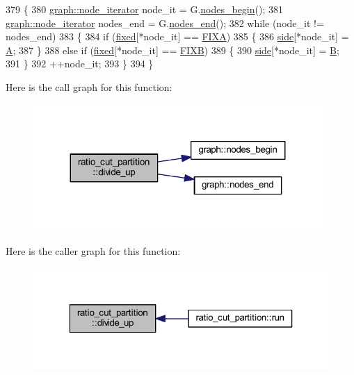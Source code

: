 \begin{DoxyCode}
379 \{
380     \mbox{\hyperlink{classgraph_a2cb374b84c133ce13f94e73c3e5da7fa}{graph::node\_iterator}} node\_it = G.\mbox{\hyperlink{classgraph_aec053a4b509d1be804237a80044c54c0}{nodes\_begin}}();
381     \mbox{\hyperlink{classgraph_a2cb374b84c133ce13f94e73c3e5da7fa}{graph::node\_iterator}} nodes\_end = G.\mbox{\hyperlink{classgraph_abbf9c0cb5629e98e1142254911238173}{nodes\_end}}();
382     \textcolor{keywordflow}{while} (node\_it != nodes\_end)
383     \{
384     \textcolor{keywordflow}{if} (\mbox{\hyperlink{classratio__cut__partition_ad77023b9f60e88274bf54f2019404768}{fixed}}[*node\_it] == \mbox{\hyperlink{classratio__cut__partition_a2fe155c63de19dc08c16bcb382f0dcbc}{FIXA}})
385     \{
386         \mbox{\hyperlink{classratio__cut__partition_a2bf913d1d8607747885177a3b585e611}{side}}[*node\_it] = \mbox{\hyperlink{classratio__cut__partition_a9c0da5ad845b01bddbc1f238fa35cdd0}{A}};
387     \}
388     \textcolor{keywordflow}{else} \textcolor{keywordflow}{if} (\mbox{\hyperlink{classratio__cut__partition_ad77023b9f60e88274bf54f2019404768}{fixed}}[*node\_it] == \mbox{\hyperlink{classratio__cut__partition_aea621a2460229773cbc095814942963a}{FIXB}})
389     \{
390         \mbox{\hyperlink{classratio__cut__partition_a2bf913d1d8607747885177a3b585e611}{side}}[*node\_it] = \mbox{\hyperlink{classratio__cut__partition_adf075987228d8adc7950d5b1ba332daa}{B}};
391     \}
392     ++node\_it;
393     \}
394 \}
\end{DoxyCode}
Here is the call graph for this function\+:\nopagebreak
\begin{figure}[H]
\begin{center}
\leavevmode
\includegraphics[width=311pt]{classratio__cut__partition_a04bea9656188ed01612106d797d1fd47_cgraph}
\end{center}
\end{figure}
Here is the caller graph for this function\+:\nopagebreak
\begin{figure}[H]
\begin{center}
\leavevmode
\includegraphics[width=323pt]{classratio__cut__partition_a04bea9656188ed01612106d797d1fd47_icgraph}
\end{center}
\end{figure}
